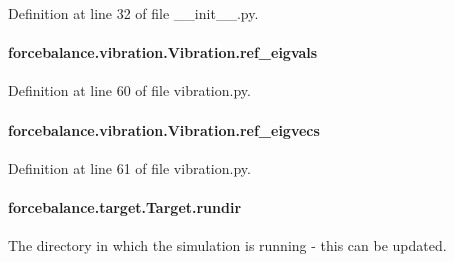 Definition at line 32 of file \-\_\-\-\_\-init\-\_\-\-\_\-.\-py.

\hypertarget{classforcebalance_1_1vibration_1_1Vibration_ab9913cb05e66e53a5781237baf9ea2e1}{
\paragraph[{ref\-\_\-eigvals}]{\setlength{\rightskip}{0pt plus 5cm}forcebalance.\-vibration.\-Vibration.\-ref\-\_\-eigvals}}\label{classforcebalance_1_1vibration_1_1Vibration_ab9913cb05e66e53a5781237baf9ea2e1}


Definition at line 60 of file vibration.\-py.

\hypertarget{classforcebalance_1_1vibration_1_1Vibration_ae9c5479bd3b01ecb3d2d40a9487ccac5}{
\paragraph[{ref\-\_\-eigvecs}]{\setlength{\rightskip}{0pt plus 5cm}forcebalance.\-vibration.\-Vibration.\-ref\-\_\-eigvecs}}\label{classforcebalance_1_1vibration_1_1Vibration_ae9c5479bd3b01ecb3d2d40a9487ccac5}


Definition at line 61 of file vibration.\-py.

\hypertarget{classforcebalance_1_1target_1_1Target_a6872de5b2d4273b82336ea5b0da29c9e}{
\paragraph[{rundir}]{\setlength{\rightskip}{0pt plus 5cm}forcebalance.\-target.\-Target.\-rundir\hspace{0.3cm}{\ttfamily [inherited]}}}\label{classforcebalance_1_1target_1_1Target_a6872de5b2d4273b82336ea5b0da29c9e}


The directory in which the simulation is running -\/ this can be updated. 

